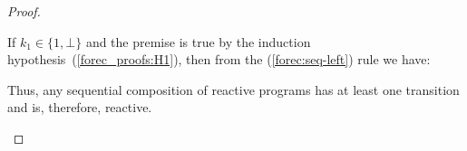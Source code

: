 \begin{proof}
\begin{enumerate}
\begin{prooftree}
					\LeftLabel{(\ref{forec:seq-right})}
			  \end{prooftree}
			  If $k_1 \in \lbrace 1, \bot \rbrace$ and the premise is true by the 
			  induction hypothesis~(\ref{forec_proofs:H1}), then from the (\ref{forec:seq-left}) 
			  rule we have:
			  \begin{prooftree}
					\LeftLabel{(\ref{forec:seq-left})}
			  \end{prooftree}
			  Thus, any sequential composition of reactive programs has at least one 
			  transition and is, therefore, reactive.
			  

\end{enumerate}
\end{proof}
